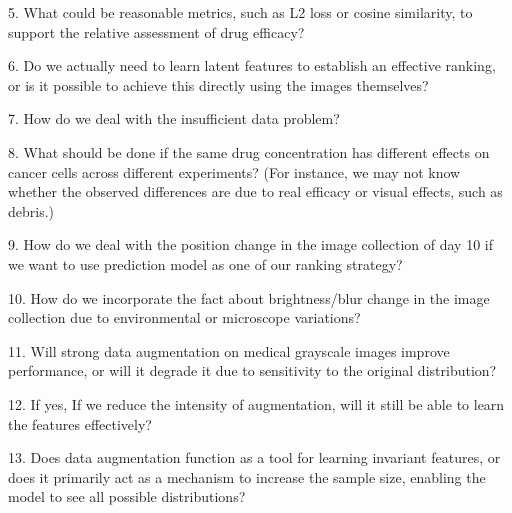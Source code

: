 5. What could be reasonable metrics, such as L2 loss or cosine similarity, to support the relative assessment of drug efficacy?

6. Do we actually need to learn latent features to establish an effective ranking, or is it possible to achieve this directly using the images themselves?

7. How do we deal with the insufficient data problem?

8. What should be done if the same drug concentration has different effects on cancer cells across different experiments? (For instance, 
we may not know whether the observed differences are due to real efficacy or visual effects, such as debris.)


9. How do we deal with the position change in the image collection of day 10 if we want to use prediction 
model as one of our ranking strategy?

10. How do we incorporate the fact about brightness/blur change in the image collection due to environmental or microscope 
variations?

11. Will strong data augmentation on medical grayscale images improve performance, or will it degrade it due to sensitivity to the original distribution?

12. If yes, If we reduce the intensity of augmentation, will it still be able to learn the features effectively?


13. Does data augmentation function as a tool for learning invariant features, or does it primarily act as a mechanism to increase the sample size,
 enabling the model to see all possible distributions?



